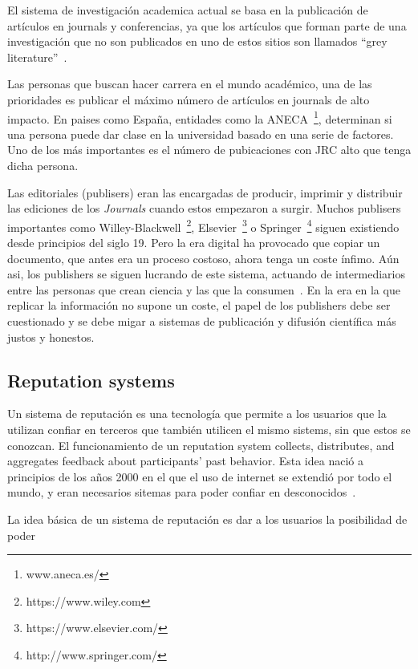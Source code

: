 El sistema de investigación academica actual se basa en la publicación de
artículos en journals y conferencias, ya que los artículos que forman parte de
una investigación que no son publicados en uno de estos sitios son llamados
``grey literature''~\cite{rothstein2009grey}.

Las personas que buscan hacer carrera en el mundo académico, una de las
prioridades es publicar el máximo número de artículos en journals de alto
impacto. En paises como España, entidades como la
ANECA~\footnote{www.aneca.es/}, determinan si una persona puede dar clase en la
universidad basado en una serie de factores. Uno de los más importantes es el
número de pubicaciones con JRC alto que tenga dicha persona.

Las editoriales (publisers) eran las encargadas de producir, imprimir y
distribuir las ediciones de los \emph{Journals} cuando estos empezaron a surgir.
Muchos publisers importantes como
Willey-Blackwell~\footnote{https://www.wiley.com},
Elsevier~\footnote{https://www.elsevier.com/} o
Springer~\footnote{http://www.springer.com/} siguen existiendo desde principios
del siglo 19. Pero la era digital ha provocado que copiar un documento, que
antes era un proceso costoso, ahora tenga un coste ínfimo. Aún asi, los
publishers se siguen lucrando de este sistema, actuando de intermediarios entre
las personas que crean ciencia y las que la
consumen~\cite{lariviere2015oligopoly}. En la era en la que replicar la
información no supone un coste, el papel de los publishers debe ser cuestionado
y se debe migar a sistemas de publicación y difusión científica más justos y
honestos.

\subsection{Reputation systems}
\label{scb:rs}
Un sistema de reputación es una tecnología que permite a los usuarios que la
utilizan confiar en terceros que también utilicen el mismo sistems, sin que
estos se conozcan. El funcionamiento de un reputation system collects,
distributes, and aggregates feedback about participants’ past behavior. Esta
idea nació a principios de los años 2000 en el que el uso de internet se
extendió por todo el mundo, y eran necesarios sitemas para poder confiar en
desconocidos~\cite{resnick2000reputation}.


La idea básica de un sistema de reputación es dar a los usuarios la posibilidad
de poder

